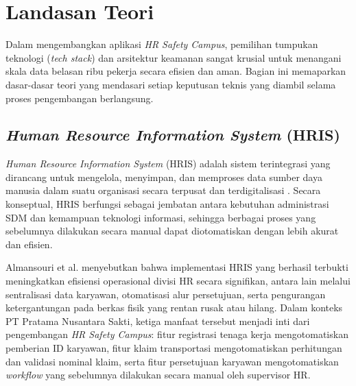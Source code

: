 %
%
%

\section{Landasan Teori}

Dalam mengembangkan aplikasi \textit{HR Safety Campus}, pemilihan tumpukan
teknologi (\textit{tech stack}) dan arsitektur keamanan sangat krusial untuk
menangani skala data belasan ribu pekerja secara efisien dan aman. Bagian ini
memaparkan dasar-dasar teori yang mendasari setiap keputusan teknis yang diambil
selama proses pengembangan berlangsung.

\subsection{\textit{Human Resource Information System} (HRIS)}

\textit{Human Resource Information System} (HRIS) adalah sistem terintegrasi
yang dirancang untuk mengelola, menyimpan, dan memproses data sumber daya manusia
dalam suatu organisasi secara terpusat dan terdigitalisasi \cite{almansouri2024hris}.
Secara konseptual, HRIS berfungsi sebagai jembatan antara kebutuhan administrasi
SDM dan kemampuan teknologi informasi, sehingga berbagai proses yang sebelumnya
dilakukan secara manual dapat diotomatiskan dengan lebih akurat dan efisien.

Almansouri et al. \cite{almansouri2024hris} menyebutkan bahwa implementasi HRIS
yang berhasil terbukti meningkatkan efisiensi operasional divisi HR secara
signifikan, antara lain melalui sentralisasi data karyawan, otomatisasi alur
persetujuan, serta pengurangan ketergantungan pada berkas fisik yang rentan
rusak atau hilang. Dalam konteks PT Pratama Nusantara Sakti, ketiga manfaat
tersebut menjadi inti dari pengembangan \textit{HR Safety Campus}: fitur
registrasi tenaga kerja mengotomatiskan pemberian ID karyawan, fitur klaim
transportasi mengotomatiskan perhitungan dan validasi nominal klaim, serta fitur
persetujuan karyawan mengotomatiskan \textit{workflow} yang sebelumnya dilakukan
secara manual oleh supervisor HR.

